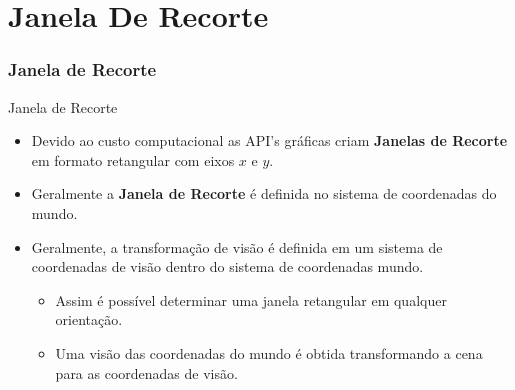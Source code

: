 \documentclass{beamer}
\begin{document}
\section{Janela De Recorte}
\begin{frame}
\frametitle{Janela de Recorte}

	\begin{block}{Janela de Recorte}
		\begin{itemize}
			\item Devido ao custo computacional as API's gráficas criam \textbf{Janelas de Recorte} em formato retangular com eixos $x$ e $y$. 
			\item Geralmente a \textbf{Janela de Recorte} é definida no sistema de coordenadas do mundo.
			\item Geralmente, a transformação de visão é definida em um sistema de coordenadas de visão dentro do sistema de coordenadas mundo.
				\begin{itemize}
					\item Assim é possível determinar uma janela retangular em qualquer orientação.
					\item Uma visão das coordenadas do mundo é obtida transformando a cena para as coordenadas de visão.
				\end{itemize}				 
		\end{itemize}
		
	\end{block}


\end{frame}
\end{document}
